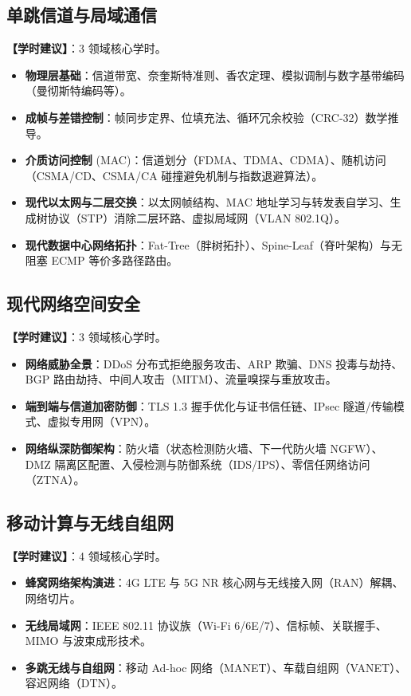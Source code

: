 \subsection{单跳信道与局域通信}
\textbf{【学时建议】}：3 领域核心学时。

\begin{itemize}
    \item \textbf{物理层基础}：信道带宽、奈奎斯特准则、香农定理、模拟调制与数字基带编码（曼彻斯特编码等）。
    \item \textbf{成帧与差错控制}：帧同步定界、位填充法、循环冗余校验（CRC-32）数学推导。
    \item \textbf{介质访问控制} (MAC)：信道划分（FDMA、TDMA、CDMA）、随机访问（CSMA/CD、CSMA/CA 碰撞避免机制与指数退避算法）。
    \item \textbf{现代以太网与二层交换}：以太网帧结构、MAC 地址学习与转发表自学习、生成树协议（STP）消除二层环路、虚拟局域网（VLAN 802.1Q）。
    \item \textbf{现代数据中心网络拓扑}：Fat-Tree（胖树拓扑）、Spine-Leaf（脊叶架构）与无阻塞 ECMP 等价多路径路由。
\end{itemize}

\subsection{现代网络空间安全}
\textbf{【学时建议】}：3 领域核心学时。

\begin{itemize}
    \item \textbf{网络威胁全景}：DDoS 分布式拒绝服务攻击、ARP 欺骗、DNS 投毒与劫持、BGP 路由劫持、中间人攻击（MITM）、流量嗅探与重放攻击。
    \item \textbf{端到端与信道加密防御}：TLS 1.3 握手优化与证书信任链、IPsec 隧道/传输模式、虚拟专用网（VPN）。
    \item \textbf{网络纵深防御架构}：防火墙（状态检测防火墙、下一代防火墙 NGFW）、DMZ 隔离区配置、入侵检测与防御系统（IDS/IPS）、零信任网络访问（ZTNA）。
\end{itemize}

\subsection{移动计算与无线自组网}
\textbf{【学时建议】}：4 领域核心学时。

\begin{itemize}
    \item \textbf{蜂窝网络架构演进}：4G LTE 与 5G NR 核心网与无线接入网（RAN）解耦、网络切片。
    \item \textbf{无线局域网}：IEEE 802.11 协议族（Wi-Fi 6/6E/7）、信标帧、关联握手、MIMO 与波束成形技术。
    \item \textbf{多跳无线与自组网}：移动 Ad-hoc 网络（MANET）、车载自组网（VANET）、容迟网络（DTN）。
\end{itemize}

